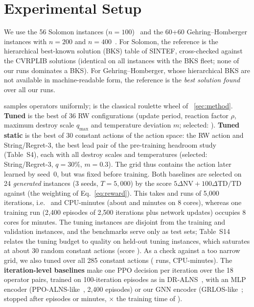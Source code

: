 \section{Experimental Setup}\label{sec:setup}
We use the 56 Solomon instances ($n=100$)~\cite{solomon1987} and the 60+60
Gehring--Homberger instances with $n=200$ and $n=400$~\cite{gehring1999}. For Solomon,
the reference is the hierarchical best-known solution (BKS) table of SINTEF,
cross-checked against the CVRPLIB solutions (identical on all \tCvSame{} instances with
the BKS fleet; none of our runs dominates a BKS). For Gehring--Homberger, whose
hierarchical BKS are not available in machine-readable form, the reference is the
\emph{best solution found} over all our runs.

\Uni{} samples operators uniformly; \Rw{} is the classical roulette wheel of
\Sect~\ref{sec:method}. \textbf{Tuned \Rw{}} is the best of 36 RW configurations
(update period, reaction factor $\rho$, maximum destroy scale $q_{\max}$ and
temperature deviation $m$; selected: \xrwtParams{}). \textbf{Tuned static} is the best
of 30 constant actions of the \sgalns{} action space: the RW action and String/Regret-3,
the best lead pair of the pre-training headroom study (Table~S4), each with all destroy
scales and temperatures (selected: String/Regret-3, $q=30\%$, $m=0.3$). The grid thus
contains the action later learned by seed~0, but was fixed before training. Both
baselines are selected on 24 \emph{generated} instances (3 seeds, $T=5{,}000$) by the
score $5\Delta\mathrm{NV}+100\Delta\mathrm{TD}/\mathrm{TD}$ against \Rw{} (the weighting
of Eq.~\eqref{eq:reward}). This takes \qTuneRunsSt{} and \qTuneRunsRw{} runs of 5{,}000
iterations, i.e.\ \qTuneCpuSt{} and \qTuneCpuRw{} CPU-minutes (about \qTuneWallSt{} and
\qTuneWallRw{} minutes on 8 cores), whereas one
training run (2{,}400 episodes of 2{,}500 iterations plus network updates) occupies
8 cores for \tTrainMin{} minutes. The tuning instances are disjoint from the training
and validation instances, and the benchmarks serve only as test sets; Table~S14 relates
the tuning budget to quality on held-out tuning instances, which saturates at about 30
random constant actions (score \qTuneThirty{}). As a check against a too narrow grid,
we also tuned over all 285 constant actions (\rcostFullRuns{} runs, \rcostFullCpu{}
CPU-minutes). %
The \textbf{iteration-level baselines} make one PPO decision per iteration over the 18
operator pairs, trained on 100-iteration episodes as in DR-ALNS~\cite{reijnen2024},
with an MLP encoder (PPO-ALNS-like~\cite{wang2025ppoalns}, 2{,}400 episodes) or our GNN
encoder (GRLOS-like~\cite{johnn2024grlos}; stopped after \tIterGnnEp{} episodes or
\tIterGnnMin{} minutes, \tIterGnnRatio{}$\times$ the training time of \sgalns{}).

